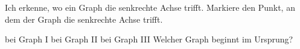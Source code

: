 \begin{aufgabe}{Ich erkenne, wo ein Graph die senkrechte Achse trifft. Markiere den Punkt, an dem der Graph die senkrechte Achse trifft.}

\begin{ksys}[xmin=0,xmax=5,ymin=0,ymax=5,ablesen]
\end{ksys}\ksysabstand\begin{ksys}[xmin=0,xmax=5,ymin=0,ymax=5,ablesen]
\end{ksys}\ksysabstand\begin{ksys}[xmin=0,xmax=5,ymin=0,ymax=5,ablesen]
\end{ksys}

\begin{teile}
\teil bei Graph I \quad \teil bei Graph II \quad \teil bei Graph III
\teil Welcher Graph beginnt im Ursprung? \hfill {}
\end{teile}
\end{aufgabe}

